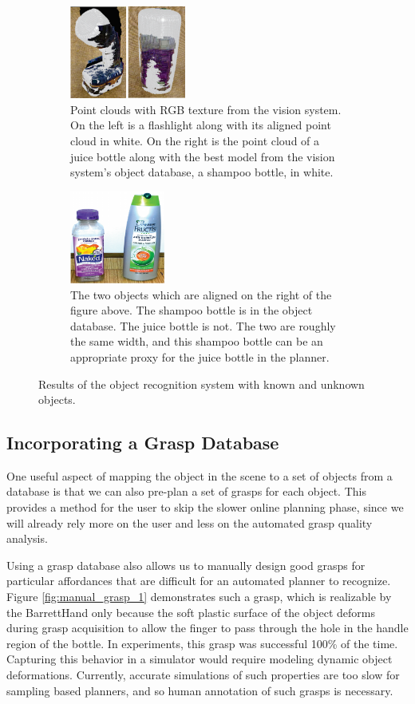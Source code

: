 \begin{figure}
\begin{subfigure}[t]{.45\columnwidth}
\centering
\includegraphics[height=1.2in,width=.99\columnwidth]{alignment_1.png}
\caption{Point clouds with RGB texture from the vision system. On the left is a flashlight along with its aligned point cloud in white. On the right is the point cloud of a juice bottle along with the best model from the vision system’s object database, a shampoo bottle, in white.}
\label{fig:alignment_1}
\end{subfigure}
\begin{subfigure}[t]{.45\columnwidth}
\centering
\includegraphics[height=1.2in,width=0.99\columnwidth]{unknown_objects_1.png}
\caption{The two objects which are aligned on the right of the figure above. The shampoo bottle is in the object database. The juice bottle is not. The two are roughly the same width, and this shampoo bottle can be an appropriate proxy for the juice bottle in the planner.}
\label{fig:unknown_objects_1}
\end{subfigure}
\caption{Results of the object recognition system with known and unknown objects.}
\end{figure}


\subsection{Incorporating a Grasp Database}
One useful aspect of mapping the object in the scene to a set of objects from a database is that we can also pre-plan a set of grasps for each object. This provides a method for the user to skip the slower online planning phase, since we will already rely more on the user and less on the automated grasp quality analysis. 

Using a grasp database also allows us to manually design good grasps for particular affordances that are difficult for an automated planner to recognize. Figure \ref{fig:manual_grasp_1} demonstrates such a grasp, which is realizable by the BarrettHand only because the soft plastic surface of the object deforms during grasp acquisition to allow the finger to pass through the hole in the handle region of the bottle.  In experiments, this grasp was successful 100\% of the time.  Capturing this behavior in a simulator would require modeling dynamic object deformations. Currently, accurate simulations of such properties are too slow for sampling based planners, and so human annotation of such grasps is necessary. 

